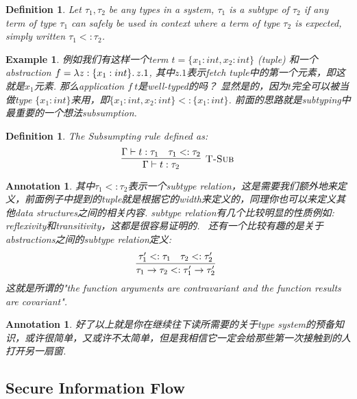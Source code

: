 \documentclass{article}
\newtheorem{example}[theorem]{Example}
\newtheorem{definition}[theorem]{Definition}
\newtheorem{annotation}[theorem]{Annotation}
\newcommand{\lam}[2]{\ensuremath{\lambda #1\ldotp #2}} %
\newcommand{\termtype}[2]{\ensuremath{#1:#2}}
\begin{document}
\begin{definition}
\rm Let $\tau_1,\tau_2$ be any types in a system, $\tau_1$ is a \emph{subtype} of $\tau_2$ if any term of type $\tau_1$ can safely be used in context where a term of type $\tau_2$ is expected, simply written $\tau_1 <: \tau_2$.
\end{definition}

\begin{example}
\rm 例如我们有这样一个term $t = \{x_1:int, x_2:int\}$ (tuple) 和一个abstraction $f = \lam{z:\{x_1:int\}}{z.1}$, 其中$z.1$表示fetch tuple中的第一个元素，即这就是$x_1$元素. 那么application $f~t$是well-typed的吗？ 显然是的，因为$t$完全可以被当做type $\{x_1:int\}$来用，即$\{x_1:int, x_2:int\} <: \{x_1:int\}$. 前面的思路就是subtyping中最重要的一个想法\emph{subsumption}.
\end{example}

\begin{definition}
\rm The Subsumpting rule defined as:
\[
	\infer[\textsc{T-Sub}]{\Gamma \vdash \termtype{t}{\tau_2}}{\Gamma \vdash \termtype{t}{\tau_1} & \tau_1 <: \tau_2}
\]
\end{definition}

\begin{annotation}
\rm 其中$\tau_1 <: \tau_2$表示一个subtype relation，这是需要我们额外地来定义，前面例子中提到的tuple就是根据它的width来定义的，同理你也可以来定义其他data structures之间的相关内容. subtype relation有几个比较明显的性质例如: reflexivity和transitivity，这都是很容易证明的. 
\
还有一个比较有趣的是关于abstractions之间的subtype relation定义:
\[
	\infer[]{\tau_1 \to \tau_2 <: \tau_1' \to \tau_2'}{\tau_1' <: \tau_1 & \tau_2 <: \tau_2'}
\]
这就是所谓的"the function arguments are contravariant and the function results are covariant".
\end{annotation}

\begin{annotation}
\rm 好了以上就是你在继续往下读所需要的关于type system的预备知识，或许很简单，又或许不太简单，但是我相信它一定会给那些第一次接触到的人打开另一扇窗. 
\end{annotation}

\subsection{Secure Information Flow}
\end{document}
